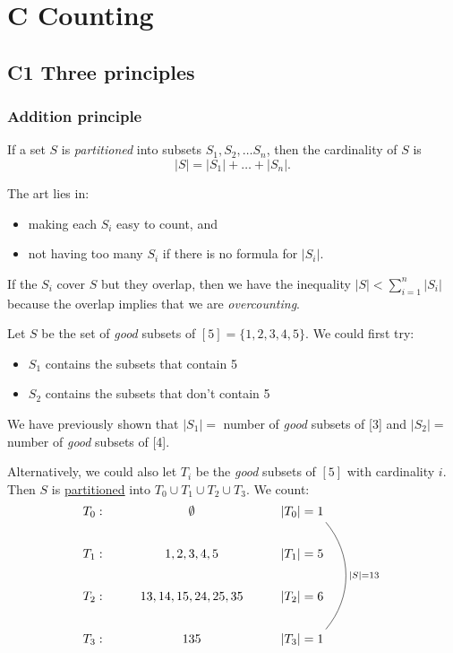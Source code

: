 \documentclass[12pt]{article}
\begin{document}
\section{C Counting}
\subsection{C1 Three principles}
\subsubsection{Addition principle}
 If a set $S$ is \textit{partitioned} into subsets $S_1,S_2,\dots S_n$, then the cardinality of $S$ is $$|S|=|S_1|+\dots +|S_n|.$$

The art lies in:\begin{itemize}
    \item making each $S_i$ easy to count, and
    \item not having too many $S_i$ if there is no formula for $|S_i|$.
\end{itemize}

\rmk[Variations] If the $S_i$ cover $S$ but they overlap, then we have the inequality $\displaystyle |S|<\sum_{i=1}^{n}|S_i|$ because the overlap implies that we are \textit{overcounting}.

\eg Let $S$ be the set of \textit{good} subsets of $[5]=\{1,2,3,4,5\}$. We could first try:\begin{itemize}
    \item $S_1$ contains the subsets that contain 5
    \item $S_2$ contains the subsets that don't contain 5
\end{itemize}
We have previously shown that $|S_1|=$ number of \textit{good} subsets of [3] and $|S_2|=$ number of \textit{good} subsets of [4].

Alternatively, we could also let $T_i$ be the \textit{good} subsets of $[5]$ with cardinality $i$. Then $S$ is \uline{partitioned} into $T_0\cup T_1\cup T_2\cup T_3$. We count:
\[\begin{tikzcd}[ampersand replacement=\&,cramped]
	{T_0:} \& \emptyset \& {|T_0|=1} \\
	{T_1:} \& {1,2,3,4,5} \& {|T_1|=5} \\
	{T_2:} \& {13,14,15,24,25,35} \& {|T_2|=6} \\
	{T_3:} \& 135 \& {|T_3|=1}
	\arrow["{|S|=13}", shift left=5, bend left=40, no head, from=1-3, to=4-3]
\end{tikzcd}\]
\end{document}

